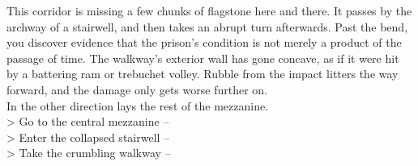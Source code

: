 This corridor is missing a few chunks of flagstone here and there. It passes by the archway of a stairwell, and then takes an abrupt turn afterwards. Past the bend, you discover evidence that the prison’s condition is not merely a product of the passage of time. The walkway's exterior wall has gone concave, as if it were hit by a battering ram or trebuchet volley. Rubble from the impact litters the way forward, and the damage only gets worse further on.\\

In the other direction lays the rest of the mezzanine.\\

> Go to the central mezzanine -- \\
> Enter the collapsed stairwell -- \\
> Take the crumbling walkway -- \\